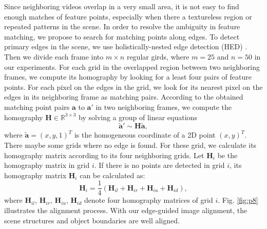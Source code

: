 \documentclass[conference]{IEEEtran}
\begin{document}
Since neighboring videos overlap in a very small area, it is not easy to find enough matches of feature points, especially when there a textureless region or repeated patterns in the scene. 
In order to resolve the ambiguity in feature matching, we propose to search for matching points along edges.
%
To detect primary edges in the scene, we use holistically-nested edge detection (HED) \cite{xie2015holistically}. 
Then we divide each frame into $m \times n$ regular girds, where $m=25$ and $n=50$ in our experiments.
%
For each grid in the overlapped region between two neighboring frames, we compute its homography by looking for a least four pairs of feature points.
%
For each pixel on the edges in the grid, we look for its nearest pixel on the edges in its neighboring frame as matching pairs.  
%
According to the obtained matching point pairs $\mathbf{a}$ to $\mathbf{a}'$ in two neighboring frames, we compute the homography $\mathbf{H} \in \mathbb{R}^{3 \times 3}$ by solving a group of linear equations 
\begin{equation}
\widetilde{\textbf{a}}' \sim \mathbf{H} \widetilde{\textbf{a}},
\end{equation}
where $\widetilde{\mathbf{a}}=(x,y,1)^{T}$ is the homogeneous coordinate of a 2D point $(x,y)^{T}$.  
There maybe some grids where no edge is found. 
For these grid, we calculate its homography matrix according to its four neighboring grids. 
Let $\textbf{H}_i$ be the homography matrix in grid $i$.
If there is no points are detected in grid $i$, its homography matrix $\textbf{H}_{i}$ can be calculated as:
\begin{equation}
\textbf{H}_{i} = \frac{1}{4}\left(\textbf{H}_{il}+\textbf{H}_{ir}+\textbf{H}_{iu}+\textbf{H}_{id}\right),
\end{equation} 
where $\textbf{H}_{il}$, 
$\textbf{H}_{ir}$, 
$\textbf{H}_{iu}$, 
$\textbf{H}_{id}$ 
denote four homography matrices of grid 
$i$.
Fig. \ref{fig:p8} illustrates the alignment process.
With our edge-guided image alignment, the scene structures and object boundaries are well aligned. 
\end{document}
